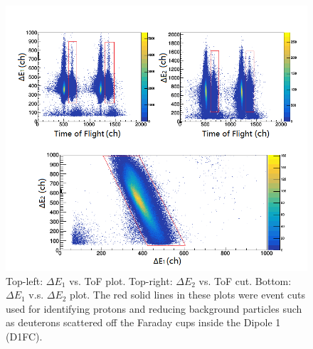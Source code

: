 \begin{figure}[tpb]
  \begin{center}
    \centerline{\includegraphics[scale=0.7]{graph/ch4/PID}}
    \caption{Top-left: $\Delta E_1$ vs. ToF plot. Top-right: $\Delta E_2$ vs. ToF cut. Bottom: $\Delta E_1$ v.s. $\Delta E_2$ plot. The red solid lines in these plots were event cuts  used for identifying protons and reducing background particles such as deuterons scattered off the Faraday cups inside the Dipole 1 (D1FC).}
    \label{fig:PID}
  \end{center}
\end{figure}



